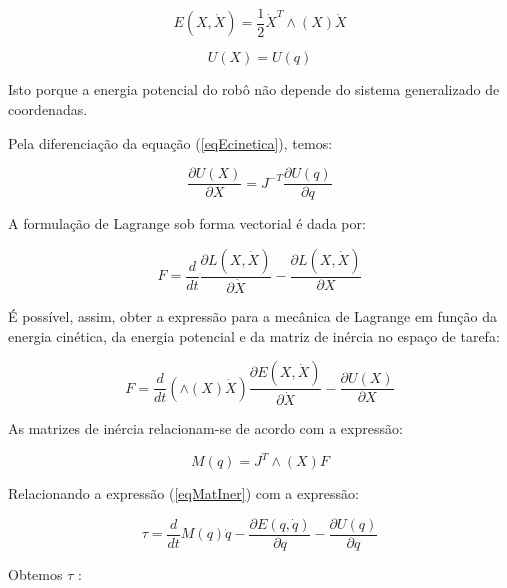 \documentclass[a4paper,twocolumn,final,11pt]{article}
\let\oldref\ref
\renewcommand{\ref}[1]{(\oldref{#1})}
\begin{document}
\begin{equation}
    E(X,\dot{X})=\frac{1}{2} \dot{X}^{T} \wedge(X) \dot{X}
    \label{eqEcinetica}
\end{equation}

\begin{equation}
   U(X) = U(q)
\end{equation}

Isto porque a energia potencial do robô não depende do sistema generalizado de coordenadas.
\linebreak

Pela diferenciação da equação \ref{eqEcinetica}, temos:

\begin{equation}
   \frac {\partial U(X)}{\partial X} = J^{-T} \frac{\partial U(q)}{\partial q}
\end{equation}
\linebreak

A formulação de Lagrange sob forma vectorial é dada por:

\begin{equation}
   F = \frac {d}{dt} \frac{\partial L(X,\dot{X})}{\partial \dot{X}} - \frac{\partial L(X,\dot{X})}{\partial X}
\end{equation}
\linebreak

É possível, assim, obter a expressão para a mecânica de Lagrange em função da energia cinética, da energia potencial e da matriz de inércia no espaço de tarefa:

\begin{equation}
       F = \frac {d}{dt}(\wedge (X)\dot{X})  \frac{\partial E(X,\dot{X})}{\partial \dot{X}} - \frac{\partial U(X)}{\partial X}
\end{equation}
\linebreak

As matrizes de inércia relacionam-se de acordo com a expressão:

\begin{equation}
       M(q) = J^{T} \wedge(X) F
       \label{eqMatIner}
\end{equation}

Relacionando a expressão \ref{eqMatIner} com a expressão:

\begin{equation}
      \tau = \frac{d}{dt}M(q)\dot{q} - \frac{\partial E(q,\dot{q})}{\partial q} - \frac{\partial U(q)}{\partial q}
\end{equation}

Obtemos $\tau$ :
\end{document}
